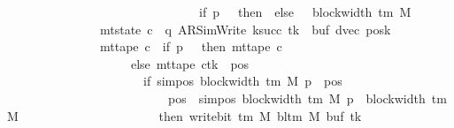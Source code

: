 \begin{isabellebody}
\ \ \ \ \ \ \ \ \ \ \ \ \ \ \ \ \ \ \ \ \ \ \ \ \ \ \ \ \ \ {\isacharcircum}{\kern0pt}{\isacharcircum}{\kern0pt}\ {\isacharparenleft}{\kern0pt}if\ p\ {\isacharequal}{\kern0pt}\ {}\ then\ {}\ else\ {}\ {\isacharasterisk}{\kern0pt}\ block{\isacharunderscore}{\kern0pt}width\ {\isacharparenleft}{\kern0pt}{\isasymGamma}{\isacharunderscore}{\kern0pt}tm\ M{\isacharparenright}{\kern0pt}{\isacharparenright}{\kern0pt}\isanewline
\ \ \ \ \ \ \ \ \ \ \ \ \ \ {\isasymand}\ mt{\isacharunderscore}{\kern0pt}state\ c{\isacharprime}{\kern0pt}{\isacharprime}{\kern0pt}\ {\isacharequal}{\kern0pt}\ {\isacharparenleft}{\kern0pt}q{\isacharcomma}{\kern0pt}\ AR{\isacharunderscore}{\kern0pt}SimWrite{\isacharcomma}{\kern0pt}\ k{\isacharunderscore}{\kern0pt}succ\ tk{\isacharcomma}{\kern0pt}\ {}{\isacharcomma}{\kern0pt}\ buf{\isacharcomma}{\kern0pt}\ dvec{\isacharcomma}{\kern0pt}\ posk{\isacharparenright}{\kern0pt}\isanewline
\ \ \ \ \ \ \ \ \ \ \ \ \ \ {\isasymand}\ mt{\isacharunderscore}{\kern0pt}tape\ c{\isacharprime}{\kern0pt}{\isacharprime}{\kern0pt}\ {\isacharequal}{\kern0pt}\ {\isacharparenleft}{\kern0pt}if\ p\ {\isacharequal}{\kern0pt}\ {}\ then\ mt{\isacharunderscore}{\kern0pt}tape\ c{\isacharprime}{\kern0pt}\isanewline
\ \ \ \ \ \ \ \ \ \ \ \ \ \ \ \ \ \ \ \ else\ {\isacharparenleft}{\kern0pt}mt{\isacharunderscore}{\kern0pt}tape\ c{\isacharprime}{\kern0pt}{\isacharparenright}{\kern0pt}{\isacharparenleft}{\kern0pt}tk\ {\isacharcolon}{\kern0pt}{\isacharequal}{\kern0pt}\ {\isacharparenleft}{\kern0pt}{\isasymlambda}pos{\isachardot}{\kern0pt}\isanewline
\ \ \ \ \ \ \ \ \ \ \ \ \ \ \ \ \ \ \ \ \ \ if\ sim{\isacharunderscore}{\kern0pt}pos\ {\isacharparenleft}{\kern0pt}block{\isacharunderscore}{\kern0pt}width\ {\isacharparenleft}{\kern0pt}{\isasymGamma}{\isacharunderscore}{\kern0pt}tm\ M{\isacharparenright}{\kern0pt}{\isacharparenright}{\kern0pt}\ p\ {\isasymle}\ pos\isanewline
\ \ \ \ \ \ \ \ \ \ \ \ \ \ \ \ \ \ \ \ \ \ \ \ \ {\isasymand}\ pos\ {\isacharless}{\kern0pt}\ sim{\isacharunderscore}{\kern0pt}pos\ {\isacharparenleft}{\kern0pt}block{\isacharunderscore}{\kern0pt}width\ {\isacharparenleft}{\kern0pt}{\isasymGamma}{\isacharunderscore}{\kern0pt}tm\ M{\isacharparenright}{\kern0pt}{\isacharparenright}{\kern0pt}\ p\ {\isacharplus}{\kern0pt}\ block{\isacharunderscore}{\kern0pt}width\ {\isacharparenleft}{\kern0pt}{\isasymGamma}{\isacharunderscore}{\kern0pt}tm\ M{\isacharparenright}{\kern0pt}\isanewline
\ \ \ \ \ \ \ \ \ \ \ \ \ \ \ \ \ \ \ \ \ \ then\ write{\isacharunderscore}{\kern0pt}bit\ {\isacharparenleft}{\kern0pt}{\isasymGamma}{\isacharunderscore}{\kern0pt}tm\ M{\isacharparenright}{\kern0pt}\ {\isacharparenleft}{\kern0pt}bl{\isacharunderscore}{\kern0pt}tm\ M{\isacharparenright}{\kern0pt}\ {\isacharparenleft}{\kern0pt}buf\ tk{\isacharparenright}{\kern0pt}\isanewline

\end{isabellebody}
